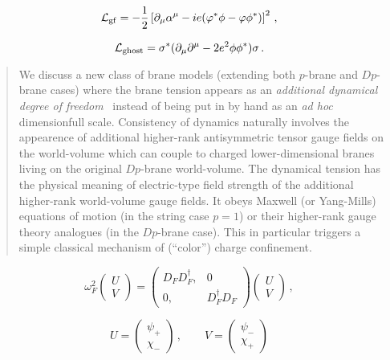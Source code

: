 \documentclass[]{article}
\begin{document}
\begin{equation}
	{\cal L}_{\rm gf}=-\frac 12 \left[ \partial_\mu \alpha^\mu 
	-ie (\varphi^* \phi - \varphi \phi^*) \right]^2\,,\label{gfterm}
\end{equation}

\begin{equation}
	{\cal L}_{\rm ghost}= \sigma^* ( \partial_\mu \partial^\mu 
	-2e^2 \phi \phi^* )\sigma \,.\label{ghostac}
\end{equation}





\begin{abstract}
	We discuss a new class of brane models (extending both $p$-brane and $Dp$-brane 
	cases) where the brane tension appears as an {\em additional dynamical degree of
		freedom}~ instead of being put in by hand as an {\em ad hoc}~ dimensionfull scale.
	Consistency of dynamics naturally involves the appearence of additional higher-rank
	antisymmetric tensor gauge fields on the world-volume 
	which can couple to charged
	lower-dimensional branes living on the original $Dp$-brane world-volume.
	The dynamical tension has the physical meaning of electric-type field strength of
	the additional higher-rank world-volume gauge fields. It obeys Maxwell (or 
	Yang-Mills) equations of motion (in the string case $p=1$) or their higher-rank
	gauge theory analogues (in the $Dp$-brane case). This in particular triggers
	a simple classical mechanism of (``color'') charge confinement.    
\end{abstract}



\begin{equation}
	\omega_F^2 \left( \begin{array}{c} U \\ V \end{array} \right)
	= \left( \begin{array}{cc} D_F D_F^\dag ,& 0 \\
		0,& D_F^\dag D_F \end{array} \right)
	\left( \begin{array}{c} U \\ V \end{array} \right) \,,
	\label{sqDir}
\end{equation}

\begin{equation}
	U=\left( \begin{array}{c} \psi_+ \\ \chi_- \end{array} \right)
	\,,\qquad 
	V=\left( \begin{array}{c} \psi_- \\ \chi_+ \end{array} \right)
	\label{defUV}
\end{equation}
\end{document}
